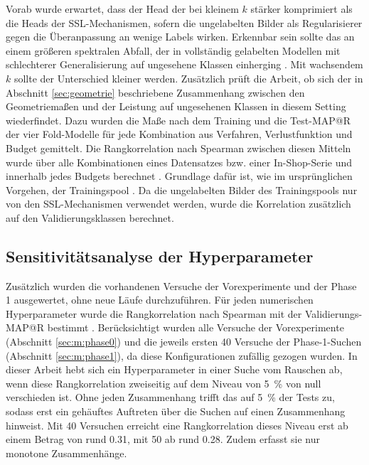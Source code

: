 Vorab wurde erwartet, dass der Head der \UEBL bei kleinem $k$ stärker komprimiert als die Heads der \ac{SSL}-Mechanismen, sofern die ungelabelten Bilder als Regularisierer gegen die Überanpassung an wenige Labels wirken. Erkennbar sein sollte das an einem größeren spektralen Abfall, der in vollständig gelabelten Modellen mit schlechterer Generalisierung auf ungesehene Klassen einherging \cite{roth_revisiting_2020}. Mit wachsendem $k$ sollte der Unterschied kleiner werden. Zusätzlich prüft die Arbeit, ob sich der in Abschnitt \ref{sec:geometrie} beschriebene Zusammenhang zwischen den Geometriemaßen und der Leistung auf ungesehenen Klassen in diesem Setting wiederfindet. Dazu wurden die Maße nach dem Training und die Test-\ac{MAP@R} der vier Fold-Modelle für jede Kombination aus Verfahren, Verlustfunktion und Budget gemittelt. Die Rangkorrelation nach Spearman zwischen diesen Mitteln wurde über alle Kombinationen eines Datensatzes bzw. einer In-Shop-Serie und innerhalb jedes Budgets berechnet \cite{spearman_proof_1904}. Grundlage dafür ist, wie im ursprünglichen Vorgehen, der Trainingspool \cite{roth_revisiting_2020}. Da die ungelabelten Bilder des Trainingspools nur von den \ac{SSL}-Mechanismen verwendet werden, wurde die Korrelation zusätzlich auf den Validierungsklassen berechnet.

\subsection{Sensitivitätsanalyse der Hyperparameter}
\label{sec:m:sensitivitaet}

Zusätzlich wurden die vorhandenen Versuche der Vorexperimente und der Phase 1 ausgewertet, ohne neue Läufe durchzuführen. Für jeden numerischen Hyperparameter wurde die Rangkorrelation nach Spearman mit der Validierungs-\ac{MAP@R} bestimmt \cite{spearman_proof_1904}. Berücksichtigt wurden alle Versuche der Vorexperimente (Abschnitt \ref{sec:m:phase0}) und die jeweils ersten 40 Versuche der Phase-1-Suchen (Abschnitt \ref{sec:m:phase1}), da diese Konfigurationen zufällig gezogen wurden. In dieser Arbeit hebt sich ein Hyperparameter in einer Suche vom Rauschen ab, wenn diese Rangkorrelation zweiseitig auf dem Niveau von \qty{5}{\percent} von null verschieden ist. Ohne jeden Zusammenhang trifft das auf \qty{5}{\percent} der Tests zu, sodass erst ein gehäuftes Auftreten über die Suchen auf einen Zusammenhang hinweist. Mit 40 Versuchen erreicht eine Rangkorrelation dieses Niveau erst ab einem Betrag von rund \num{0.31}, mit 50 ab rund \num{0.28}. Zudem erfasst sie nur monotone Zusammenhänge.


